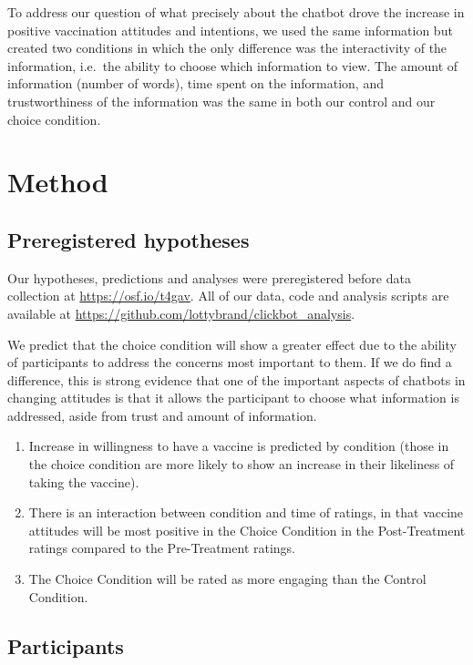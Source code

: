 \documentclass[
  english,
  ,jou,floatsintext]{apa6}
\begin{document}
To address our question of what precisely about the chatbot drove the increase in positive vaccination attitudes and intentions, we used the same information but created two conditions in which the only difference was the interactivity of the information, i.e.~the ability to choose which information to view. The amount of information (number of words), time spent on the information, and trustworthiness of the information was the same in both our control and our choice condition.

\hypertarget{method}{%
\section{Method}\label{method}}

\hypertarget{preregistered-hypotheses}{%
\subsection{Preregistered hypotheses}\label{preregistered-hypotheses}}

Our hypotheses, predictions and analyses were preregistered before data collection at \url{https://osf.io/t4gav}. All of our data, code and analysis scripts are available at \url{https://github.com/lottybrand/clickbot_analysis}.

We predict that the choice condition will show a greater effect due to the ability of participants to address the concerns most important to them. If we do find a difference, this is strong evidence that one of the important aspects of chatbots in changing attitudes is that it allows the participant to choose what information is addressed, aside from trust and amount of information.

\begin{enumerate}
\def\labelenumi{\arabic{enumi})}
\item
  Increase in willingness to have a vaccine is predicted by condition (those in the choice condition are more likely to show an increase in their likeliness of taking the vaccine).
\item
  There is an interaction between condition and time of ratings, in that vaccine attitudes will be most positive in the Choice Condition in the Post-Treatment ratings compared to the Pre-Treatment ratings.
\item
  The Choice Condition will be rated as more engaging than the Control Condition.
\end{enumerate}

\hypertarget{participants}{%
\subsection{Participants}\label{participants}}
\end{document}
